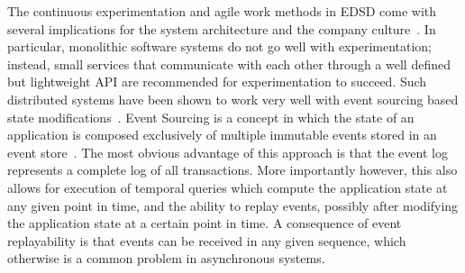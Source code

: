 The continuous experimentation and agile work methods in \ac{EDSD} come with several implications for the system architecture and the company culture~\cite{Lindgren2015,Olsson2012}.
In particular, monolithic software systems do not go well with experimentation; instead, small services that communicate with each other through a well defined but lightweight API are recommended for experimentation to succeed.
Such distributed systems have been shown to work very well with event sourcing based state modifications~\cite{source?}.
Event Sourcing is a concept in which the state of an application is composed exclusively of multiple immutable events stored in an event store~\cite{WEB:Fowler:2005}.
The most obvious advantage of this approach is that the event log represents a complete log of all transactions.
More importantly however, this also allows for execution of temporal queries which compute the application state at any given point in time, and the ability to replay events, possibly after modifying the application state at a certain point in time.
A consequence of event replayability is that events can be received in any given sequence, which otherwise is a common problem in asynchronous systems.
